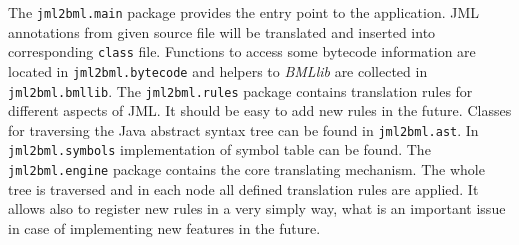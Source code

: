 \documentclass{acm_proc_article-sp}
\begin{document}
The \texttt{jml2bml.main} package provides the entry point to the application. JML annotations from given source file will be translated and inserted into corresponding \texttt{class} file. Functions to access some bytecode information are located in \texttt{jml2bml.bytecode} and helpers to \textit{BMLlib} are collected in \texttt{jml2bml.bmllib}. The \texttt{jml2bml.rules} package contains translation rules for different aspects of JML. It should be easy to add new rules in the future. Classes for traversing the Java abstract syntax tree can be found in \texttt{jml2bml.ast}. In \texttt{jml2bml.symbols} implementation of symbol table can be found. The \texttt{jml2bml.engine} package contains the core translating mechanism. The whole tree is traversed and in each node all defined translation rules are applied. It allows also to register new rules in a very simply way, what is an important issue in case of implementing new features in the future.
\end{document}
